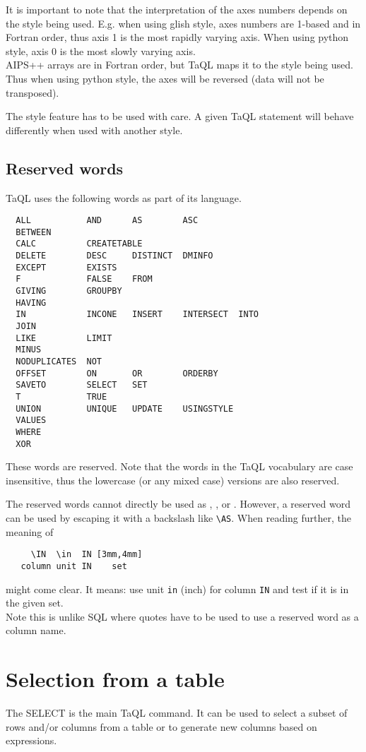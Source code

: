 It is important to note that the interpretation of the axes numbers
depends on the style being used. E.g. when using glish style, axes numbers are
1-based and in Fortran order, thus axis 1 is the most rapidly varying
axis. When using python style, axis 0 is the most slowly varying axis.
\\AIPS++ arrays are in Fortran order, but TaQL maps it to the
style being used. Thus when using python style, the axes will be
reversed (data will not be transposed).

The style feature has to be used with care. A given TaQL statement will
behave differently when used with another style.

\subsection{\label{TAQL:RESERVEDWORDS}Reserved words}
TaQL uses the following words as part of its language.
\begin{verbatim}
  ALL           AND      AS        ASC
  BETWEEN 
  CALC          CREATETABLE
  DELETE        DESC     DISTINCT  DMINFO
  EXCEPT        EXISTS
  F             FALSE    FROM
  GIVING        GROUPBY
  HAVING
  IN            INCONE   INSERT    INTERSECT  INTO
  JOIN
  LIKE          LIMIT
  MINUS
  NODUPLICATES  NOT
  OFFSET        ON       OR        ORDERBY
  SAVETO        SELECT   SET
  T             TRUE
  UNION         UNIQUE   UPDATE    USINGSTYLE
  VALUES 
  WHERE
  XOR
\end{verbatim}
These words are reserved. Note that the words in the TaQL vocabulary
are case insensitive, 
thus the lowercase (or any mixed case) versions are also reserved.

The reserved words cannot directly be used as
,
, or 
.
However, a reserved word can be used by escaping it with a backslash like
\verb+\+\texttt{AS}. When reading further, the meaning of
\begin{verbatim}
     \IN  \in  IN [3mm,4mm]
   column unit IN    set
\end{verbatim}
might come clear. It means: use unit \texttt{in} (inch) for column
\texttt{IN} and test if it is in the given set. 
\\Note this is unlike SQL where quotes have to be used to use a
reserved word as a column name.

\section{Selection from a table}
The SELECT is the main TaQL command. It can be used to select a subset
of rows and/or columns from a table or to generate new columns based
on expressions.

